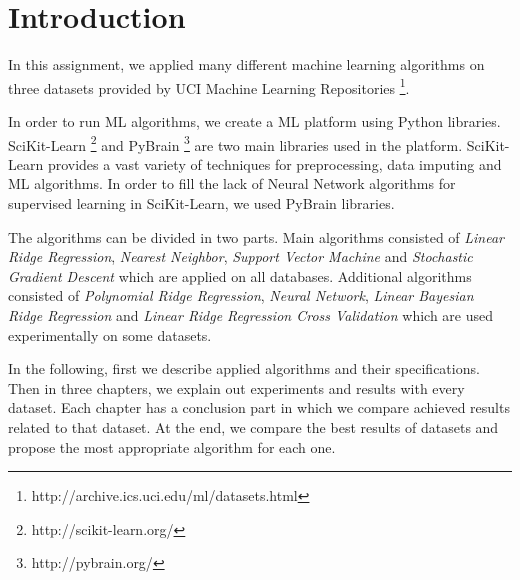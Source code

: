 \section{Introduction}
In this assignment, we applied many different machine learning algorithms on three datasets provided by UCI Machine Learning Repositories \footnote{http://archive.ics.uci.edu/ml/datasets.html}.

In order to run ML algorithms, we create a ML platform using Python libraries. SciKit-Learn \footnote{http://scikit-learn.org/} and PyBrain  \footnote{http://pybrain.org/} are two main libraries used in the platform. SciKit-Learn provides a vast variety of techniques for preprocessing, data imputing and ML algorithms. In order to fill the lack of Neural Network algorithms for supervised learning in SciKit-Learn, we used PyBrain libraries.

The algorithms can be divided in two parts. Main algorithms consisted of \textit{Linear Ridge Regression}, \textit{Nearest Neighbor}, \textit{Support Vector Machine} and \textit{Stochastic Gradient Descent} which are applied on  all databases. Additional algorithms consisted of \textit{Polynomial Ridge Regression}, \textit{Neural Network}, \textit{Linear Bayesian Ridge Regression} and \textit{Linear Ridge Regression Cross Validation} which are used experimentally on some datasets.

In the following, first we describe applied algorithms and their specifications. Then in three chapters, we explain out experiments and results with every dataset. Each chapter has a conclusion part in which we compare achieved results related to that dataset. At the end, we compare the best results of datasets and propose the most appropriate algorithm for each one.